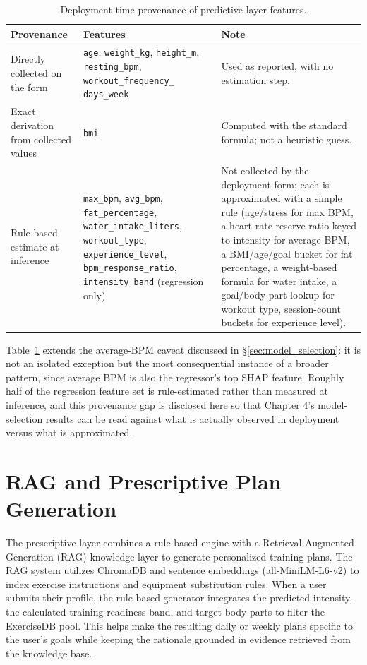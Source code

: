 \documentclass{aitthesis}
\begin{document}
\begin{table}[H]
\centering
\small
\caption{Deployment-time provenance of predictive-layer features.}
\label{tab:feature_provenance}
\begin{tabularx}{\linewidth}{p{2.8cm}p{5.2cm}X}
\toprule
\textbf{Provenance} & \textbf{Features} & \textbf{Note} \\
\midrule
Directly collected on the form & \texttt{age}, \texttt{weight\_kg}, \texttt{height\_m}, \texttt{resting\_bpm}, \texttt{workout\_frequency\_} \texttt{days\_week} & Used as reported, with no estimation step. \\[10pt]
Exact derivation from collected values & \texttt{bmi} & Computed with the standard formula; not a heuristic guess. \\[10pt]
Rule-based estimate at inference & \texttt{max\_bpm}, \texttt{avg\_bpm}, \texttt{fat\_percentage}, \texttt{water\_intake\_liters}, \texttt{workout\_type}, \texttt{experience\_level}, \texttt{bpm\_response\_ratio}, \texttt{intensity\_band} (regression only) & Not collected by the deployment form; each is approximated with a simple rule (age/stress for max BPM, a heart-rate-reserve ratio keyed to intensity for average BPM, a BMI/age/goal bucket for fat percentage, a weight-based formula for water intake, a goal/body-part lookup for workout type, session-count buckets for experience level). \\
\bottomrule
\end{tabularx}
\end{table}

Table~\ref{tab:feature_provenance} extends the average-BPM caveat discussed in \S\ref{sec:model_selection}: it is not an isolated exception but the most consequential instance of a broader pattern, since average BPM is also the regressor's top SHAP feature. Roughly half of the regression feature set is rule-estimated rather than measured at inference, and this provenance gap is disclosed here so that Chapter 4's model-selection results can be read against what is actually observed in deployment versus what is approximated.

\section{RAG and Prescriptive Plan Generation}

The prescriptive layer combines a rule-based engine with a Retrieval-Augmented Generation (RAG) knowledge layer to generate personalized training plans. The RAG system utilizes ChromaDB and sentence embeddings (all-MiniLM-L6-v2) to index exercise instructions and equipment substitution rules. When a user submits their profile, the rule-based generator integrates the predicted intensity, the calculated training readiness band, and target body parts to filter the ExerciseDB pool. This helps make the resulting daily or weekly plans specific to the user's goals while keeping the rationale grounded in evidence retrieved from the knowledge base.
\end{document}
